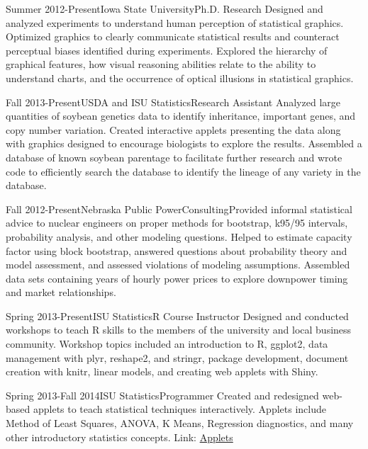 \documentclass[10pt]{tccv}
\begin{document}
\begin{eventlist}
% 

\item{Summer 2012-Present}{Iowa State University}{Ph.D. Research}{
Designed and analyzed experiments to understand human perception of statistical graphics. Optimized graphics to clearly communicate statistical results and counteract perceptual biases identified during experiments. Explored the hierarchy of graphical features, how visual reasoning abilities relate to the ability to understand charts, and the occurrence of optical illusions in statistical graphics. \cite{sineillusionjcgs,jsm2014,jsm2014userpanel,jsm2013}}

\item{Fall 2013-Present}{USDA and ISU Statistics}{Research Assistant}{
Analyzed large quantities of soybean genetics data to identify inheritance, important genes, and copy number variation. Created interactive applets presenting the data along with graphics designed to encourage biologists to explore the results. Assembled a database of known soybean parentage to facilitate further research and wrote code to efficiently search the database to identify the lineage of any variety in the database. }

\item{Fall 2012-Present}{Nebraska Public Power}{Consulting}{Provided informal statistical advice to nuclear engineers on proper methods for bootstrap, k95/95 intervals, probability analysis, and other modeling questions. Helped to estimate capacity factor using block bootstrap, answered questions about probability theory and model assessment, and assessed violations of modeling assumptions. Assembled data sets containing years of hourly power prices to explore downpower timing and market relationships.}

\item{Spring 2013-Present}{ISU Statistics}{R Course Instructor}{
Designed and conducted workshops to teach R skills to the members of the university and local business community. Workshop topics included an introduction to R, ggplot2, data management with plyr, reshape2, and stringr, package development, document creation with knitr, linear models, and creating web applets with Shiny. }

\item{Spring 2013-Fall 2014}{ISU Statistics}{Programmer}{
Created and redesigned web-based applets to teach statistical techniques interactively. Applets include Method of Least Squares, ANOVA, K Means, Regression diagnostics, and many other introductory statistics concepts. Link: \href{http://vanderplas.dyndns-remote.com:3838/}{Applets}}


\end{eventlist}
\end{document}

